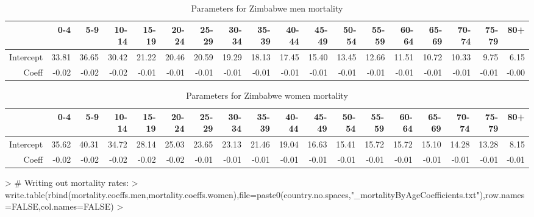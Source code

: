 \documentclass{article}
\begin{document}
\begin{landscape}
\begin{table}[ht]
\centering
\begin{tabular}{rrrrrrrrrrrrrrrrrr}
  \hline
 & 0-4 & 5-9 & 10-14 & 15-19 & 20-24 & 25-29 & 30-34 & 35-39 & 40-44 & 45-49 & 50-54 & 55-59 & 60-64 & 65-69 & 70-74 & 75-79 & 80+ \\ 
  \hline
Intercept & 33.81 & 36.65 & 30.42 & 21.22 & 20.46 & 20.59 & 19.29 & 18.13 & 17.45 & 15.40 & 13.45 & 12.66 & 11.51 & 10.72 & 10.33 & 9.75 & 6.15 \\ 
  Coeff & -0.02 & -0.02 & -0.02 & -0.01 & -0.01 & -0.01 & -0.01 & -0.01 & -0.01 & -0.01 & -0.01 & -0.01 & -0.01 & -0.01 & -0.01 & -0.01 & -0.00 \\ 
   \hline
\end{tabular}
\caption{Parameters for Zimbabwe men mortality} 
\end{table}%
\begin{table}[ht]
\centering
\begin{tabular}{rrrrrrrrrrrrrrrrrr}
  \hline
 & 0-4 & 5-9 & 10-14 & 15-19 & 20-24 & 25-29 & 30-34 & 35-39 & 40-44 & 45-49 & 50-54 & 55-59 & 60-64 & 65-69 & 70-74 & 75-79 & 80+ \\ 
  \hline
Intercept & 35.62 & 40.31 & 34.72 & 28.14 & 25.03 & 23.65 & 23.13 & 21.46 & 19.04 & 16.63 & 15.41 & 15.72 & 15.72 & 15.10 & 14.28 & 13.28 & 8.15 \\ 
  Coeff & -0.02 & -0.02 & -0.02 & -0.02 & -0.02 & -0.01 & -0.01 & -0.01 & -0.01 & -0.01 & -0.01 & -0.01 & -0.01 & -0.01 & -0.01 & -0.01 & -0.01 \\ 
   \hline
\end{tabular}
\caption{Parameters for Zimbabwe women mortality} 
\end{table}

\end{landscape}


%
\begin{Schunk}
\begin{Sinput}
> # Writing out mortality rates:
> write.table(rbind(mortality.coeffs.men,mortality.coeffs.women),file=paste0(country.no.spaces,"_mortalityByAgeCoefficients.txt"),row.names=FALSE,col.names=FALSE)
> 
\end{Sinput}
\end{Schunk}
\end{document}
